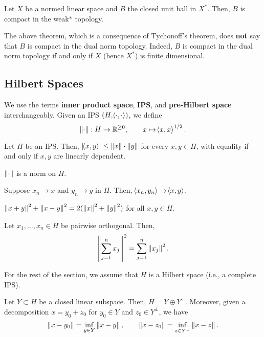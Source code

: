 \documentclass[11pt]{article}
\begin{document}
\begin{theorem}
Let $X$ be a normed linear space and $B$ the closed unit ball in $X^*$. Then, $B$ is compact in the weak* topology.
\end{theorem}

The above theorem, which is a consequence of Tychonoff's theorem, does \textbf{not} say that $B$ is compact in the dual norm topology. Indeed, $B$ is compact in the dual norm topology if and only if $X$ (hence $X^*$) is finite dimensional.

\subsection{Hilbert Spaces}
We use the terms \textbf{inner product space}, \textbf{IPS}, and \textbf{pre-Hilbert space} interchangeably. Given an IPS $(H,\!\left\langle\cdot,\cdot\right\rangle)$, we define 
$$\left\lVert\cdot\right\rVert: H\to\mathbb{R}^{\geq0},\qquad x\mapsto\!\left\langle x,x\right\rangle^{1/2}.$$

\begin{proposition}
Let $H$ be an IPS. Then, $\left\lvert\!\left\langle x,y\right\rangle\right\rvert\leq\left\lVert x\right\rVert\cdot\left\lVert y\right\rVert$ for every $x,y\in H$, with equality if and only if $x,y$ are linearly dependent.
\end{proposition}

\begin{corollary}
$\left\lVert\cdot\right\rVert$ is a norm on $H$.
\end{corollary}

\begin{corollary}
Suppose $x_n\to x$ and $y_n\to y$ in $H$. Then, $\!\left\langle x_n,y_n\right\rangle\to\!\left\langle x,y\right\rangle$.
\end{corollary}

\begin{corollary}
$\left\lVert x+y\right\rVert^2+\left\lVert x-y\right\rVert^2=2(\left\lVert x\right\rVert^2+\left\lVert y\right\rVert^2)$ for all $x,y\in H$.
\end{corollary}

\begin{corollary}
Let $x_1,\ldots,x_n\in H$ be pairwise orthogonal. Then, 
$$\left\lVert\sum_{j=1}^nx_j\right\rVert^2=\sum_{j=1}^n\left\lVert x_j\right\rVert^2.$$
\end{corollary}

For the rest of the section, we assume that $H$ is a Hilbert space (i.e., a complete IPS).

\begin{theorem}
Let $Y\subset H$ be a closed linear subspace. Then, $H=Y\oplus Y^{\perp}$. Moreover, given a decomposition $x=y_0+z_0$ for $y_0\in Y$ and $z_0\in Y^{\perp}$, we have
$$\left\lVert x-y_0\right\rVert=\inf_{y\in Y}\left\lVert x-y\right\rVert,\qquad\left\lVert x-z_0\right\rVert=\inf_{z\in Y^{\perp}}\left\lVert x-z\right\rVert.$$
\end{theorem}
\end{document}
